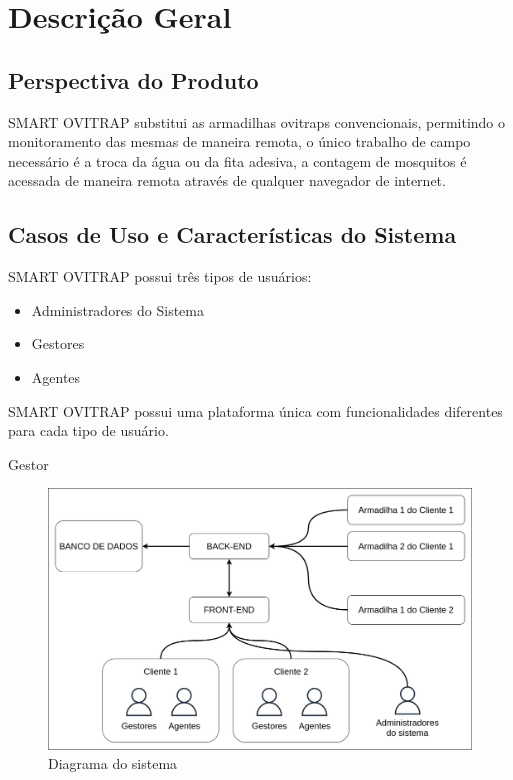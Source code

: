 	\newpage
	\chapter*{Descrição Geral}
	
	\section*{Perspectiva do Produto}
	SMART OVITRAP substitui as armadilhas ovitraps convencionais, permitindo o monitoramento das mesmas de maneira remota, o único trabalho de campo necessário é
	a troca da água ou da fita adesiva, a contagem de mosquitos é acessada de maneira remota através de qualquer navegador de internet.
	
	\section*{Casos de Uso e Características do Sistema}
	SMART OVITRAP possui três tipos de usuários:
	
	\begin{itemize}
		\item Administradores do Sistema
		\item Gestores
		\item Agentes
	\end{itemize}
	
	SMART OVITRAP possui uma plataforma única com funcionalidades diferentes para cada tipo de usuário.
	
	Gestor
	
	\begin{figure}[H]
		\centering
		\includegraphics[scale=0.3]{imagens/DiagramaPlataforma.png}
		\caption{Diagrama do sistema}
	\end{figure}
		
